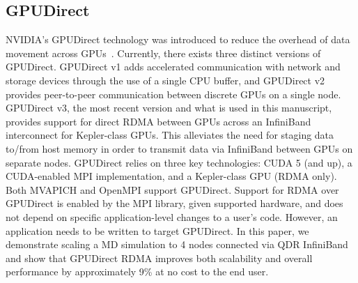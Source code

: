 \documentclass[10pt]{sigplanconf}
\begin{document}
\subsection{GPUDirect}
NVIDIA's GPUDirect technology was introduced to reduce the overhead of data movement across GPUs~\cite{GPUDirect, shainer2011development}.  
Currently, there exists three distinct versions of GPUDirect.  GPUDirect v1 adds accelerated communication with network and storage devices through the use of a single CPU buffer, and GPUDirect v2 provides peer-to-peer communication between discrete GPUs on a single node.  GPUDirect v3, the most recent version and what is used in this manuscript, provides support for direct RDMA between GPUs across an InfiniBand interconnect for Kepler-class GPUs. This alleviates the need for staging data to/from host memory in order to transmit data via InfiniBand between GPUs on separate nodes. 
GPUDirect relies on three key technologies: CUDA 5
(and up), a CUDA-enabled MPI implementation, and a Kepler-class GPU (RDMA only).
Both MVAPICH and OpenMPI support GPUDirect.  Support for RDMA over GPUDirect is
enabled by the MPI library, given supported hardware, and does not depend on specific application-level changes to a user's code.  However, an application needs to be written to target GPUDirect.
In this paper, %
we demonstrate scaling a MD simulation to 4 nodes connected via QDR InfiniBand
and show that GPUDirect RDMA improves both scalability and overall performance
by approximately 9\% at no cost to the end user.









\end{document}
